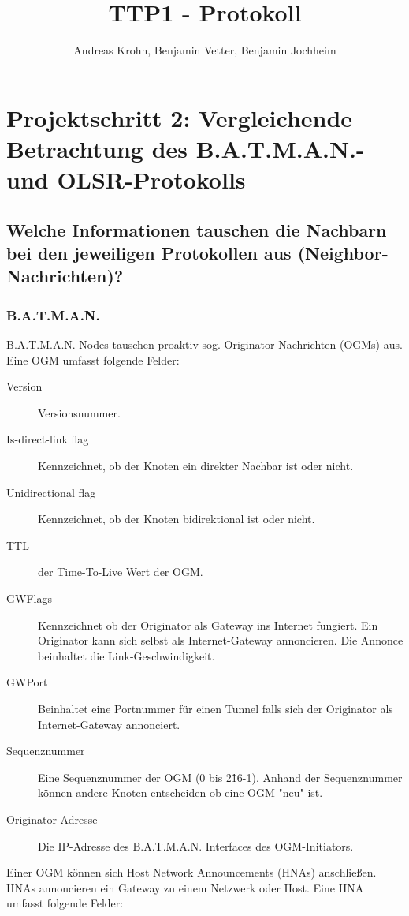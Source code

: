 \documentclass[a4paper,10pt]{article}
\title{TTP1 - Protokoll}
\author{Andreas Krohn, Benjamin Vetter, Benjamin Jochheim}
\begin{document}
\maketitle

\section{Projektschritt 2: Vergleichende Betrachtung des B.A.T.M.A.N.- und OLSR-Protokolls}

\subsection{Welche Informationen tauschen die Nachbarn bei den jeweiligen Protokollen aus (Neighbor-Nachrichten)?}


\subsubsection*{B.A.T.M.A.N.}

B.A.T.M.A.N.-Nodes tauschen proaktiv sog. Originator-Nachrichten (OGMs) aus.
Eine OGM umfasst folgende Felder: 

\begin{description}
  \item[Version] Versionsnummer.
  \item[Is-direct-link flag] Kennzeichnet, ob der Knoten ein direkter Nachbar ist oder nicht.
  \item[Unidirectional flag] Kennzeichnet, ob der Knoten bidirektional ist oder nicht.
  \item[TTL] der Time-To-Live Wert der OGM.
  \item[GWFlags] Kennzeichnet ob der Originator als Gateway ins Internet fungiert. Ein Originator kann sich selbst als Internet-Gateway annoncieren. Die Annonce beinhaltet die Link-Geschwindigkeit.
  \item[GWPort] Beinhaltet eine Portnummer für einen Tunnel falls sich der Originator als Internet-Gateway annonciert.
  \item[Sequenznummer] Eine Sequenznummer der OGM (0 bis 2\^16-1). Anhand der Sequenznummer können andere Knoten entscheiden ob eine OGM "neu" ist.
  \item[Originator-Adresse] Die IP-Adresse des B.A.T.M.A.N. Interfaces des OGM-Initiators.
\end{description}

Einer OGM können sich Host Network Announcements (HNAs) anschließen. 
HNAs annoncieren ein Gateway zu einem Netzwerk oder Host.
Eine HNA umfasst folgende Felder: 
\end{document}
